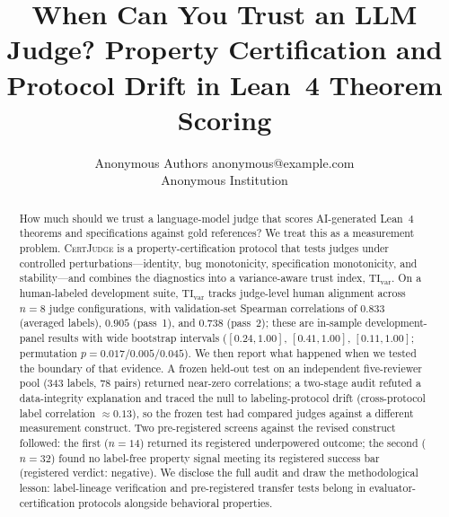 \documentclass{article}
\title{When Can You Trust an LLM Judge? Property Certification and Protocol Drift in Lean~4 Theorem Scoring}
\author{\name Anonymous Authors \email anonymous@example.com \\
  \addr Anonymous Institution}
\begin{document}
\maketitle

\begin{abstract}
  How much should we trust a language-model judge that scores AI-generated Lean~4 theorems and specifications against gold references? We treat this as a measurement problem. \textsc{CertJudge} is a property-certification protocol that tests judges under controlled perturbations---identity, bug monotonicity, specification monotonicity, and stability---and combines the diagnostics into a variance-aware trust index, \(\mathrm{TI}_{\mathrm{var}}\). On a human-labeled development suite, \(\mathrm{TI}_{\mathrm{var}}\) tracks judge-level human alignment across \(n{=}8\) judge configurations, with validation-set Spearman correlations of \(0.833\) (averaged labels), \(0.905\) (pass~1), and \(0.738\) (pass~2); these are in-sample development-panel results with wide bootstrap intervals (\([0.24,1.00]\), \([0.41,1.00]\), \([0.11,1.00]\); permutation \(p=0.017/0.005/0.045\)). We then report what happened when we tested the boundary of that evidence. A frozen held-out test on an independent five-reviewer pool (343 labels, 78 pairs) returned near-zero correlations; a two-stage audit refuted a data-integrity explanation and traced the null to labeling-protocol drift (cross-protocol label correlation \(\approx 0.13\)), so the frozen test had compared judges against a different measurement construct. Two pre-registered screens against the revised construct followed: the first (\(n{=}14\)) returned its registered underpowered outcome; the second (\(n{=}32\)) found no label-free property signal meeting its registered success bar (registered verdict: negative). We disclose the full audit and draw the methodological lesson: label-lineage verification and pre-registered transfer tests belong in evaluator-certification protocols alongside behavioral properties.


\end{abstract}
\end{document}
